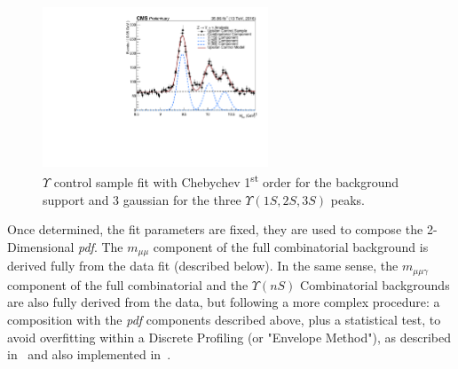 \begin{figure}[!htbp]
\begin{center}

\includegraphics[width=0.60\textwidth]{figures_and_tables/fitPlotFiles2D/UpsilonControlSample/upsilonControlSample_ZToUpsilonPhoton_Cat0}

\end{center}\vspace*{-.5cm}

\caption{$\Upsilon$ control sample fit with Chebychev 1\textsuperscript{st} order for the background support and 3 gaussian for the three $\Upsilon(1S,2S,3S)$ peaks.}
\label{fig:upsilon_control_Fit}
\end{figure}




Once determined, the fit parameters are fixed, they are used to compose the 2-Dimensional \textit{pdf}. The $m_{\mu\mu}$ component of the full combinatorial background is derived fully from the data fit (described below). In the same sense, the $m_{\mu\mu\gamma}$ component of the full combinatorial and the $\Upsilon(nS)$ Combinatorial backgrounds are also fully derived from the data, but following a more complex procedure: a composition with the \textit{pdf} components described above, plus a statistical test, to avoid overfitting within a Discrete Profiling (or "Envelope Method"), as described in~\cite{DiscreteProfilingMethod} and also implemented in~\cite{higgs_gammagamma_PAPPER}. 


